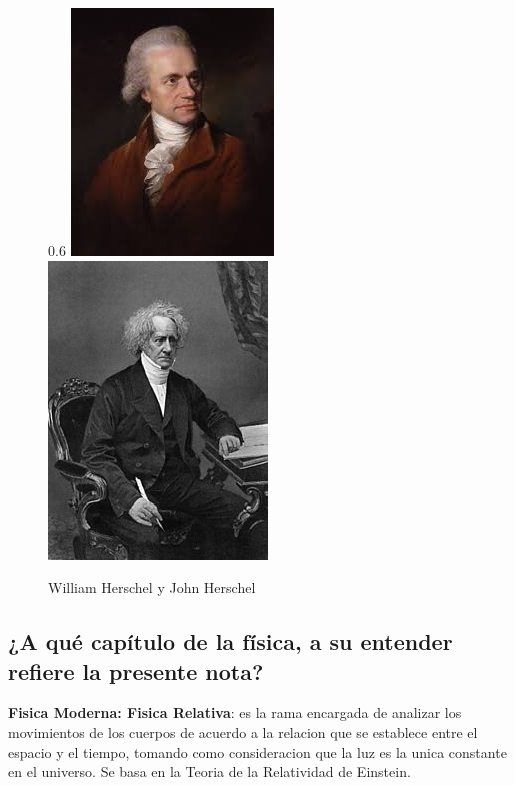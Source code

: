 \documentclass[11pt]{article}
\begin{document}
\begin{multicols}{2}
\begin{figure}{0.6\linewidth}
  \centering
  \includegraphics[width=0.6\linewidth]{william.jpeg}
  \includegraphics[width=0.6\linewidth]{john.jpg}
  \caption{William Herschel y John Herschel}
  
\end{figure}


\subsection{¿A qué capítulo de la física, a su entender refiere la presente nota?}
\label{sec:1}

\textbf{Fisica Moderna: Fisica Relativa}: es la rama encargada de analizar los movimientos de los cuerpos de acuerdo a la relacion que se establece entre el espacio y el tiempo, tomando como consideracion que la luz es la unica constante en el universo. Se basa en la Teoria de la Relatividad de Einstein. \cite{fisica}



\end{multicols}
\end{document}
